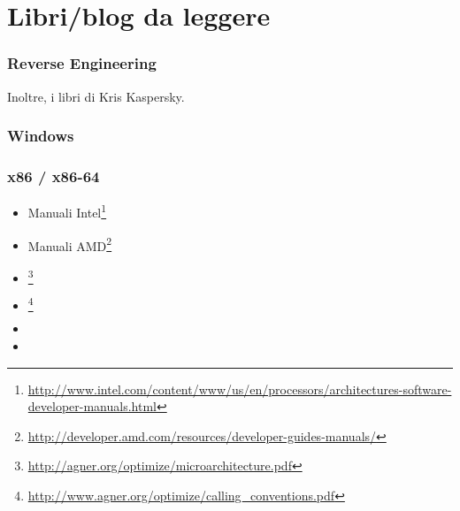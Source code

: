 \chapter{Libri/blog da leggere}


\subsection{Reverse Engineering}



Inoltre, i libri di Kris Kaspersky.

\subsection{Windows}



\subsection{\CCpp}



\subsection{x86 / x86-64}

\label{x86_manuals}
\begin{itemize}
\item Manuali Intel\footnote{\AlsoAvailableAs \url{http://www.intel.com/content/www/us/en/processors/architectures-software-developer-manuals.html}}

\item Manuali AMD\footnote{\AlsoAvailableAs \url{http://developer.amd.com/resources/developer-guides-manuals/}}

\item \AgnerFog{}\footnote{\AlsoAvailableAs \url{http://agner.org/optimize/microarchitecture.pdf}}

\item \AgnerFogCC{}\footnote{\AlsoAvailableAs \url{http://www.agner.org/optimize/calling_conventions.pdf}}

\item \IntelOptimization

\item \AMDOptimization
\end{itemize}


